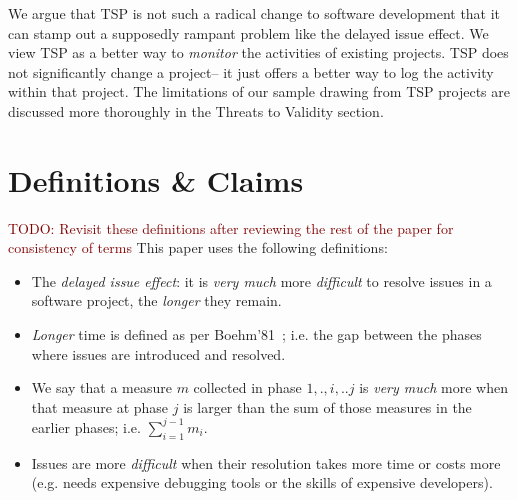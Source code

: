 \documentclass[smallcondensed]{svjour3}
\newcommand{\todo}[1]{\textcolor{Maroon}{TODO: #1}}
\newcommand{\bi}{\begin{itemize}}%
\newcommand{\ei}{\end{itemize}}
\begin{document}
We argue that TSP is not such a radical change to software development that it can
stamp out a supposedly rampant problem like the delayed issue effect. We view TSP as a better way to
 {\em monitor} the activities   of  existing projects.  TSP
 does not significantly change a project-- it just offers a better way to log the activity within
 that project. The limitations of our sample drawing from TSP projects are discussed more thoroughly in the Threats to Validity section. 
 

 





 
\section{Definitions \& Claims}
\todo{Revisit these definitions after reviewing the rest of the paper for consistency of terms}
This paper uses the following definitions:
\bi
\item
The {\em delayed issue effect}:   it is {\em very much}  more {\em difficult} to resolve  issues in a software project, the {\em longer} they remain.
\item
 {\em Longer} time is defined as per  Boehm'81~\cite{Boehm81}; i.e. the gap between the   phases where   issues are introduced and resolved.
\item
We say that a measure $m$ collected in phase ${1,.,i,..j}$ is 
{\em very much} more when  that
   measure at phase $j$   
   is larger than the sum of those measures in the earlier phases;
   i.e. $\sum_{i=1}^{j-1} m_i $. 
\item
Issues are more {\em difficult}  
when their resolution takes more time or costs more  (e.g. needs expensive
debugging tools or the skills of expensive developers).
\ei
\end{document}
